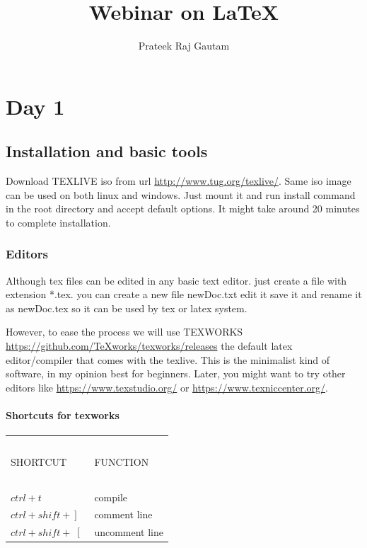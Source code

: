 \documentclass[twocolumn]{book}
\title{Webinar on \LaTeX}
\author{Prateek Raj Gautam}
\begin{document}
\maketitle







%
\tableofcontents
\chapter{Day 1}

\section{Installation and basic tools}
Download TEXLIVE iso  from url \url{http://www.tug.org/texlive/}. Same iso image can be used on both linux and windows. Just mount it and run install command in the root directory and accept default options. It might take around 20 minutes to complete installation.
\subsection{Editors}
Although tex files can be edited in any basic text editor. just create a file with extension *.tex. you can create a new file newDoc.txt edit it save it and rename it as newDoc.tex so it can be used by tex or latex system.

However, to ease the process we will use TEXWORKS \url{https://github.com/TeXworks/texworks/releases} the default latex editor/compiler that comes with the texlive. This is the minimalist kind of software, in my opinion best for beginners. Later, you might want to try other editors like \url{https://www.texstudio.org/} or \url{https://www.texniccenter.org/}.

\subsubsection{Shortcuts for texworks}
\begin{table}[!htbp]
\begin{tabular}{p{.4\linewidth}|p{.4\linewidth}}
\hline
\ &\ \\
SHORTCUT&FUNCTION\\
\ &\ \\
\hline
$ctrl+t$&compile\\

$\left. ctrl+shift+\right]$& comment line\\
$\left. ctrl+shift+\right[$& uncomment line\\
\hline
\end{tabular}
\end{table}
\end{document}
